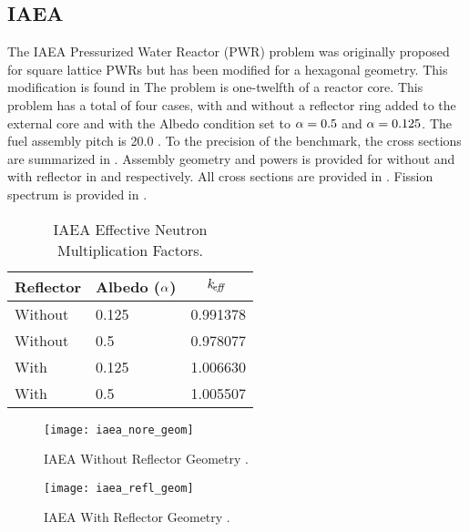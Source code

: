   \subsection{IAEA}
    \label{sec:iaea}
    The IAEA Pressurized Water Reactor (PWR) problem was originally proposed for
    square lattice PWRs but has been modified for a hexagonal geometry. This
    modification is found in \cite{chao} The problem is one-twelfth of a reactor
    core. This problem has a total of four cases, with and without a reflector
    ring added to the external core and with the Albedo condition set to
    $\alpha = 0.5$ and $\alpha = 0.125$. The fuel assembly pitch is 20.0
    . To the precision of the benchmark, the cross sections are
    summarized in .
    Assembly geometry and powers is provided for without and with 
    reflector in  and  
    respectively. All cross sections are provided in . Fission
    spectrum is provided in .
    \begin{table}
      \caption{IAEA Effective Neutron Multiplication Factors.}
      \label{tab:iaeakeff}
      \begin{center}
        \begin{tabular}{llc}
          \toprule
          Reflector & Albedo ($\alpha$) & $k_{\!\mbox{\scriptsize \em eff}}\ $ \\
          \midrule
          Without & 0.125 & 0.991378 \\
          Without & 0.5   & 0.978077 \\
          With    & 0.125 & 1.006630 \\
          With    & 0.5   & 1.005507 \\
          \bottomrule
        \end{tabular}
      \end{center}
    \end{table}
    \begin{figure}
      \centering
      \texttt{[image: iaea\_nore\_geom]}
      \caption{IAEA Without Reflector Geometry \cite{chao}.}
      \label{fig:iaea_nore_geom}
    \end{figure}
    \begin{figure}
      \centering
      \texttt{[image: iaea\_refl\_geom]}
      \caption{IAEA With Reflector Geometry \cite{chao}.}
      \label{fig:iaea_refl_geom}
    \end{figure}
